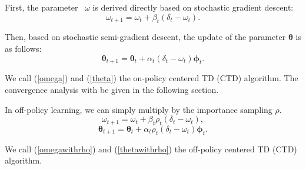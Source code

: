 First, the parameter  $\omega$ is derived directly based on
stochastic gradient descent:
\begin{equation}
\omega_{t+1}= \omega_{t}+\beta_t(\delta_t-\omega_t).
\label{omega}
\end{equation}

Then, based on stochastic semi-gradient descent, the update of 
the parameter ${\bm{\theta}}$ is as follows:
\begin{equation}
{\bm{\theta}}_{t+1}=
{\bm{\theta}}_{t}+\alpha_t(\delta_t-\omega_t)\bm{{\bm{\phi}}}_t.
\label{theta}
\end{equation}

We call (\ref{omega}) and (\ref{theta}) the on-policy centered
TD (CTD) algorithm. The convergence analysis with be given in
the following section.

In off-policy learning, we can simply multiply by the importance sampling
 $\rho$.
\begin{equation}
    \omega_{t+1}=\omega_{t}+\beta_t\rho_t(\delta_t-\omega_t),
    \label{omegawithrho}
\end{equation}
\begin{equation}
    {\bm{\theta}}_{t+1}=
    {\bm{\theta}}_{t}+\alpha_t\rho_t(\delta_t-\omega_t)\bm{{\bm{\phi}}}_t.
    \label{thetawithrho}
\end{equation}

We call (\ref{omegawithrho}) and (\ref{thetawithrho}) the off-policy centered
TD (CTD) algorithm.




